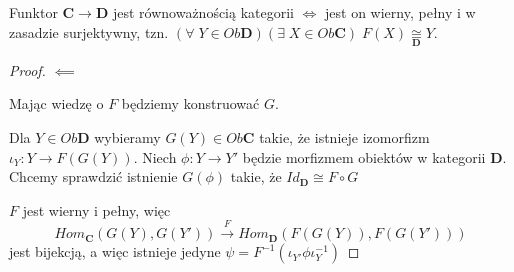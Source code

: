 \begin{theorem}
  Funktor $\mathbf{C}\to \mathbf{D}$ jest równoważnością kategorii $\iff$ jest on wierny, pełny i w zasadzie surjektywny, tzn. $(\forall\;Y\in Ob\mathbf{D})(\exists\;X\in Ob\mathbf{C})\;F(X)\underset{\mathbf{D}}{\cong}Y$.
\end{theorem}

\begin{proof}
  $\impliedby$

  Mając wiedzę o $F$ będziemy konstruować $G$.

  Dla $Y\in Ob\mathbf{D}$ wybieramy $G(Y)\in Ob\mathbf{C}$ takie, że istnieje izomorfizm $\iota_Y:Y\to F(G(Y))$. Niech $\phi:Y\to Y'$ będzie morfizmem obiektów w kategorii $\mathbf{D}$. Chcemy sprawdzić istnienie $G(\phi)$ takie, że $Id_{\mathbf{D}}\cong F\circ G$

  \begin{center}
  \end{center}

  $F$ jest wierny i pełny, więc
  $$Hom_{\mathbf{C}}(G(Y),G(Y'))\overset{F}{\rightarrow}Hom_{\mathbf{D}}(F(G(Y)),F(G(Y')))$$
  jest bijekcją, a więc istnieje jedyne $\psi=F^{-1}(\iota_{Y'}\phi\iota_Y^{-1})$
\end{proof}
